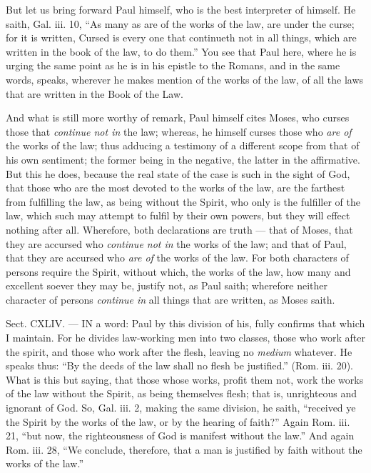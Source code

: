 But let us bring forward Paul himself, who is the best interpreter of himself. He saith, Gal. iii. 10, “As many as are of the works of the law, are under the curse; for it is written, Cursed is every one that continueth not in all things, which are written in the book of the law, to do them.” You see that Paul here, where he is urging the same point as he is in his epistle to the Romans, and in the same words, speaks, wherever he makes mention of the works of the law, of all the laws that are written in the Book of the Law.

And what is still more worthy of remark, Paul himself cites Moses, who curses those that \emph{continue not in }the law; whereas, he himself curses those who \emph{are of }the works of the law; thus adducing a testimony of a different scope from that of his own sentiment; the former being in the negative, the latter in the affirmative. But this he does, because the real state of the case is such in the sight of God, that those who are the most devoted to the works of the law, are the farthest from fulfilling the law, as being without the Spirit, who only is the fulfiller of the law, which such may attempt to fulfil by their own powers, but they will effect nothing after all. Wherefore, both declarations are truth — that of Moses, that they are accursed who \emph{continue not in }the works of the law; and that of Paul, that they are accursed who \emph{are of }the works of the law. For both characters of persons require the Spirit, without which, the works of the law, how many and excellent soever they may be, justify not, as Paul saith; wherefore neither character of persons \emph{continue in }all things that are written, as Moses saith.


Sect. CXLIV. — IN a word: Paul by this division of his, fully confirms that which I maintain. For he divides law-working men into two classes, those who work after the spirit, and those who work after the flesh, leaving no \emph{medium }whatever. He speaks thus: “By the deeds of the law shall no flesh be justified.” (Rom. iii. 20). What is this but saying, that those whose works, profit them not, work the works of the law without the Spirit, as being themselves flesh; that is, unrighteous and ignorant of God. So, Gal. iii. 2, making the same division, he saith, “received ye the Spirit by the works of the law, or by the hearing of faith?” Again Rom. iii. 21, “but now, the righteousness of God is manifest without the law.” And again Rom. iii. 28, “We conclude, therefore, that a man is justified by faith without the works of the law.”

